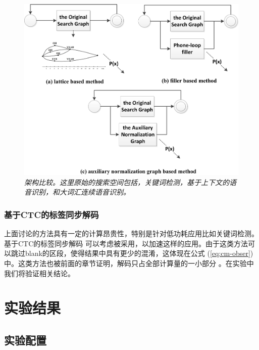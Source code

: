  \begin{figure}[tb]
        \centering
        \includegraphics[width=0.7\linewidth]{figure/graph_example.png}
        \caption{{\it 架构比较。这里原始的搜索空间包括，关键词检测，基于上下文的语音识别，和大词汇连续语音识别。 }}
        \label{fig:graph-example}
\end{figure}

 \subsubsection{基于CTC的标签同步解码}
 \label{Sec:psd-ctc}

上面讨论的方法具有一定的计算昂贵性，特别是针对低功耗应用比如关键词检测。基于CTC的标签同步解码 \cite{Chen+2016} 可以考虑被采用，以加速这样的应用。由于这类方法可以跳过blank的区段，使得结果中具有更少的混淆，这体现在公式 (\ref{eq:cm-obser})中。这类方法也被前面的章节证明，解码只占全部计算量的一小部分 \cite{Chen+2016}\cite{zhc00-chen-tasl2017} 。在实验中我们将验证相关结论。


\section{实验结果}
\label{chap:unify-exp}


\subsection{实验配置}



